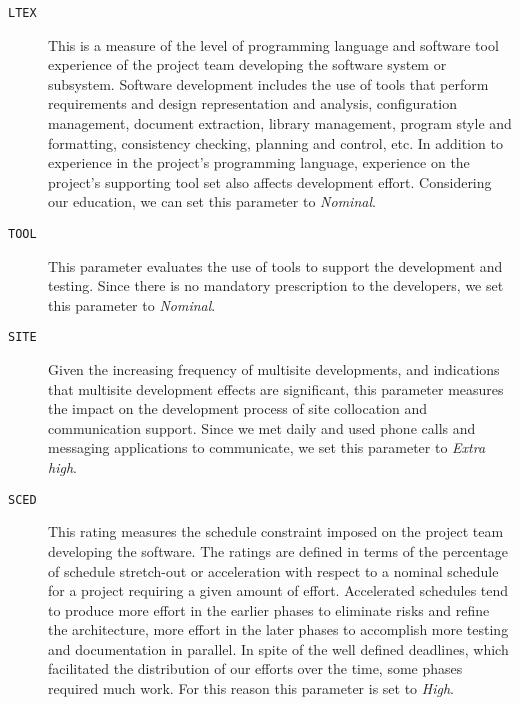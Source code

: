 \begin{description}
	\item [\normalfont\texttt{LTEX}] This is a measure of the level of programming language and software tool experience of the project team developing the software system or subsystem. Software development includes the use of tools that perform requirements and design representation and analysis, configuration management, document extraction, library management, program style and formatting, consistency checking, planning and control, etc. In addition to experience in the project's programming language, experience on the project's supporting tool set also affects development effort. Considering our education, we can set this parameter to \emph{Nominal}.

	\item [\normalfont\texttt{TOOL}] This parameter evaluates the use of tools to support the development and testing. Since there is no mandatory prescription to the developers, we set this parameter to \emph{Nominal}.

	\item [\normalfont\texttt{SITE}] Given the increasing frequency of multisite developments, and indications that multisite development effects are significant, this parameter measures the impact on the development process of site collocation and communication support. Since we met daily and used phone calls and messaging applications to communicate, we set this parameter to \emph{Extra high}.

	\item [\normalfont\texttt{SCED}] This rating measures the schedule constraint imposed on the project team developing the software. The ratings are defined in terms of the percentage of schedule stretch-out or acceleration with respect to a nominal schedule for a project requiring a given amount of effort. Accelerated schedules tend to produce more effort in the earlier phases to eliminate risks and refine the architecture, more effort in the later phases to accomplish more testing and documentation in parallel. In spite of the well defined deadlines, which facilitated the distribution of our efforts over the time, some phases required much work. For this reason this parameter is set to \emph{High}.

\end{description}
